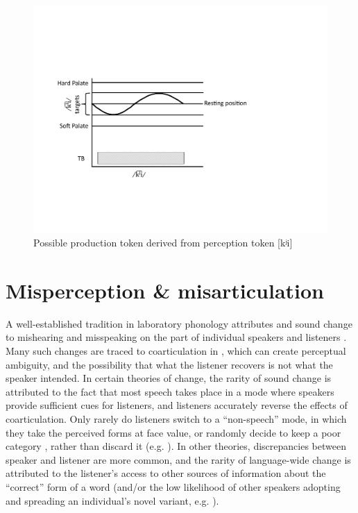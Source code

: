\begin{figure}[H]
\centering{}\includegraphics[width=.60\textwidth]{figures/palatalizationc.pdf}\caption{\label{fig:Palatalizationc}Possible production token derived from
perception token {[}{kʲi}{]}}
\end{figure}


\section{\label{subsec:Misperception-=000026-Misarticulation}Misperception \& misarticulation}\largerpage

A well-established tradition in laboratory phonology attributes 
and  sound change to mishearing and misspeaking on the
part of individual speakers and listeners \citep{Ohala1980,Ohala1981,ohala1983origin,Ohala1990}.
Many such changes are traced to coarticulation in , which
can create perceptual ambiguity, and the possibility that what the
listener recovers is not what the speaker intended. In certain theories
of change, the rarity of sound change is attributed to the fact that
most speech takes place in a mode where speakers provide sufficient
cues for listeners, and listeners accurately reverse the effects of
coarticulation. Only rarely do listeners switch to a ``non-speech''
mode, in which they take the perceived forms at face value, or randomly
decide to keep a poor category , rather than discard it (e.g.
\citealp{lindblom1990explaining,Garrett2013}). In other theories,
discrepancies between speaker and listener are more common, and the
rarity of language-wide change is attributed to the listener's access
to other sources of information about the ``correct'' form of a word
(and/or the low likelihood of other speakers adopting and spreading
an individual's novel variant, e.g. \citealt{Ohala1980}). 

